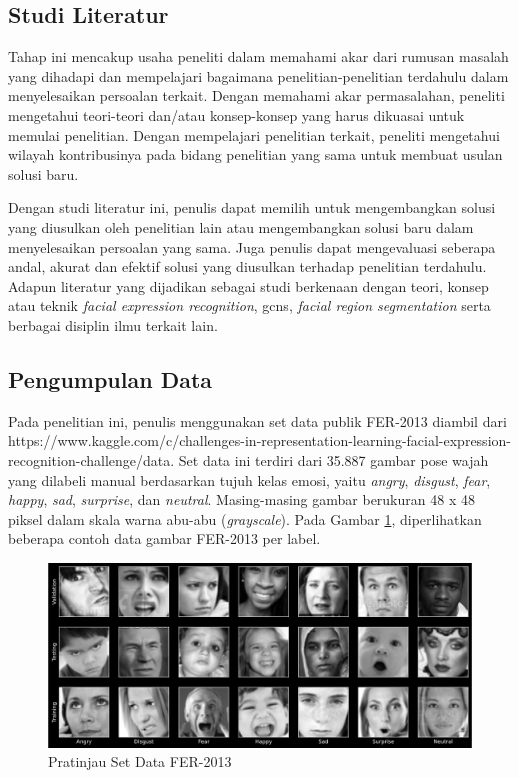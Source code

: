 \subsection{Studi Literatur}
Tahap ini mencakup usaha peneliti dalam memahami akar dari rumusan masalah yang dihadapi dan mempelajari bagaimana penelitian-penelitian terdahulu dalam menyelesaikan persoalan terkait. Dengan memahami akar permasalahan, peneliti mengetahui teori-teori dan/atau konsep-konsep yang harus dikuasai untuk memulai penelitian. Dengan mempelajari penelitian terkait, peneliti mengetahui wilayah kontribusinya pada bidang penelitian yang sama untuk membuat usulan solusi baru.

Dengan studi literatur ini, penulis dapat memilih untuk mengembangkan solusi yang diusulkan oleh penelitian lain atau mengembangkan solusi baru dalam menyelesaikan persoalan yang sama. Juga penulis dapat mengevaluasi seberapa andal, akurat dan efektif solusi yang diusulkan terhadap penelitian terdahulu. Adapun literatur yang dijadikan sebagai studi berkenaan dengan teori, konsep atau teknik \textit{facial expression recognition}, \acrshort{gcns}, \textit{facial region segmentation} serta berbagai disiplin ilmu terkait lain.

\subsection{Pengumpulan Data}
Pada penelitian ini, penulis menggunakan set data publik FER-2013 diambil dari https://www.kaggle.com/c/challenges-in-representation-learning-facial-expression-\\recognition-challenge/data. Set data ini terdiri dari 35.887 gambar pose wajah yang dilabeli manual berdasarkan tujuh kelas emosi, yaitu \textit{angry}, \textit{disgust}, \textit{fear}, \textit{happy}, \textit{sad}, \textit{surprise}, dan \textit{neutral}. Masing-masing gambar berukuran 48 x 48 piksel dalam skala warna abu-abu (\textit{grayscale}). Pada Gambar \ref{fig:pratinjaufer2013}, diperlihatkan beberapa contoh data gambar FER-2013 per label.
\begin{figure}[ht]
    \centering
    \includegraphics[width=14cm]{gambar/fer2013_label_dist5.png}
    \caption{Pratinjau Set Data FER-2013}
    \label{fig:pratinjaufer2013}
\end{figure}

